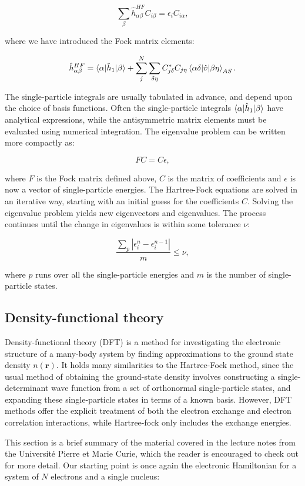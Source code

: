 \begin{equation}
\sum_{\beta} \hat{h}_{\alpha\beta}^{HF} C_{i\beta}
= \epsilon_i C_{i\alpha} ,
\end{equation}

where we have introduced the Fock matrix elements:

\begin{equation}
\hat{h}_{\alpha\beta}^{HF} = 
\braket{\alpha | \hat{h}_1 | \beta}
+ \sum_{j}^N \sum_{\delta\eta} C_{j\delta}^* C_{j\eta}
\braket{\alpha\delta | \hat{v} | \beta\eta}_{AS} .
\end{equation}

The single-particle integrals are usually tabulated
in advance, and depend upon the choice of basis functions.
Often the single-particle integrals $\braket{\alpha | \hat{h}_1 | \beta}$
have analytical expressions, while the antisymmetric matrix elements
must be evaluated using numerical integration.
The eigenvalue problem can be written more compactly as:

\begin{equation}
FC = C\epsilon ,
\end{equation}

where $F$ is the Fock matrix defined above, $C$ is the matrix
of coefficients and $\epsilon$ is now
a vector of single-particle energies.
The Hartree-Fock equations are solved in an iterative way,
starting with an initial guess for the coefficients $C$.
Solving the eigenvalue problem yields new eigenvectors
and eigenvalues.
The process continues until the change in eigenvalues
is within some tolerance $\nu$:

\begin{equation}
\frac{\sum_p \left| \epsilon_i^n - \epsilon_i^{n-1} \right|}
{m} \leq \nu ,
\end{equation}

where $p$ runs over all the single-particle energies and
$m$ is the number of single-particle states.

\subsection{Density-functional theory}
Density-functional theory (DFT) is a method for
investigating the electronic structure of a many-body system
by finding approximations to the ground state
density $n(\bm{r})$.
It holds many similarities to the Hartree-Fock method,
since the usual method of obtaining the ground-state density
involves constructing a single-determinant wave function
from a set of orthonormal single-particle states,
and expanding these single-particle states in terms
of a known basis. 
However, DFT methods offer the explicit treatment of both the
electron exchange and electron correlation interactions,
while Hartree-fock only includes
the exchange energies.
\par
This section is a brief summary of the material covered
in the \parencite[Toulouse][pages 1-12]{toulouse2017}
lecture notes from the Université Pierre et Marie Curie,
which the reader is encouraged to check out for more detail.
Our starting point is once again the electronic Hamiltonian
for a system of $N$ electrons and a single nucleus:

